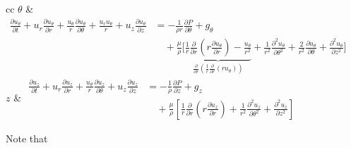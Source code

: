 \begin{table}[h]
\begin{tabular}{cc}
        $\theta$ & \(\displaystyle \begin{aligned} \frac{\partial u_{\theta}}{\partial t} + u_r \frac{\partial u_{\theta}}{\partial r} + \frac{u_{\theta}}{r} \frac{\partial u_{\theta}}{\partial \theta} + \frac{u_r u_{\theta}}{r} + u_z \frac{\partial u_{\theta}}{\partial z} &= -\frac{1}{\rho r} \frac{\partial P}{\partial \theta} + g_{\theta} \\ &\quad + \frac{\mu}{\rho} \biggr[\underbrace{\frac{1}{r} \frac{\partial}{\partial r}\left(r \frac{\partial u_{\theta}}{\partial r}\right) - \frac{u_{\theta}}{r^2}}_{\displaystyle \frac{\partial}{\partial r}\left(\frac{1}{r}\frac{\partial}{\partial r}(r u_{\theta})\right)} + \frac{1}{r^2} \frac{\partial^2 u_{\theta}}{\partial \theta^2} + \frac{2}{r^2} \frac{\partial u_{\theta}}{\partial \theta} + \frac{\partial^2 u_{\theta}}{\partial z^2}\biggr] \end{aligned}\) \\[9ex]
        $z$ & \(\displaystyle \begin{aligned} \frac{\partial u_z}{\partial t} + u_r \frac{\partial u_z}{\partial r} + \frac{u_{\theta}}{r} \frac{\partial u_z}{\partial \theta} + u_z \frac{\partial u_z}{\partial z} &= -\frac{1}{\rho} \frac{\partial P}{\partial z} + g_z \\ &\quad + \frac{\mu}{\rho} \left[\frac{1}{r} \frac{\partial}{\partial r}\left(r \frac{\partial u_z}{\partial r}\right) + \frac{1}{r^2} \frac{\partial^2 u_z}{\partial \theta^2} + \frac{\partial^2 u_z}{\partial z^2}\right] \end{aligned}\) \\[7ex]
        \end{tabular}
\end{table}
Note that 